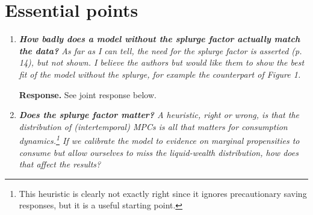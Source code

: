 \documentclass[12pt,letterpaper,english]{article}
\begin{document}
\section{Essential points}
\begin{enumerate}
	
%		
%		
%		
	
	\item \textit{\textbf{How badly does a model without the splurge factor actually match the	data?} As far as I can tell, the need for the splurge factor is asserted (p. 14), but not shown. I believe the authors but would like them to show the best fit of the model without the splurge, for example the counterpart of Figure 1. }
	
	\noindent \textbf{Response.} See joint response below. 
 
	
	\item \textit{\textbf{Does the splurge factor matter?} A heuristic, right or wrong, is that the distribution of (intertemporal) MPCs is all that matters for consumption	dynamics.\footnote{This heuristic is clearly not exactly right since it ignores precautionary saving responses,	but it is a useful starting point.} If we calibrate the model to evidence on marginal propensities to consume but allow ourselves to miss the liquid-wealth distribution, how does that affect the results?}
		

\end{enumerate}
\end{document}
